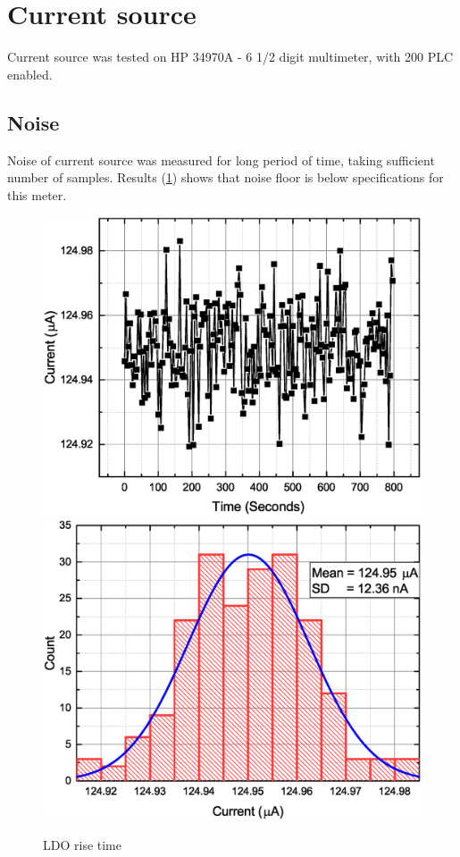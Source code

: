 \section{Current source}
    Current source was tested on HP 34970A - 6 1/2 digit multimeter, with 200 PLC enabled.

    \subsection{Noise}
        Noise of current source was measured for long period of time, taking sufficient number of samples. Results (\ref{Current_Stability}) shows that noise floor is below specifications for this meter.

        \begin{figure}[H]
            \centering
            \includegraphics[width=0.6\paperwidth]{img/07/current_time.eps}
            \includegraphics[width=0.6\paperwidth]{img/07/current_hist.eps}
            \caption{LDO rise time}
            \label{Current_Stability}
        \end{figure}


